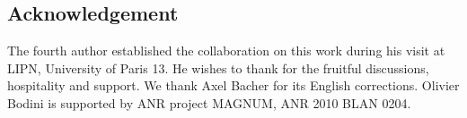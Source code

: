 \documentclass{article}
\begin{document}
\subsection*{Acknowledgement}
The fourth author established the collaboration on this work during his visit at
LIPN, University of Paris 13. He wishes to thank for the fruitful discussions, hospitality and
support.
We thank Axel Bacher for its English corrections.
Olivier Bodini is supported by ANR project MAGNUM, ANR 2010 BLAN 0204.

\newpage



\end{document}
